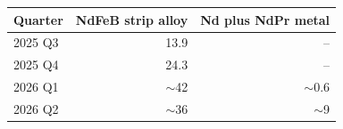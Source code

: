 \begin{tabular}{lrr}
\toprule Quarter & NdFeB strip alloy & Nd plus NdPr metal \\
\midrule
2025 Q3 & 13.9 & -- \\
2025 Q4 & 24.3 & -- \\
2026 Q1 & $\sim$42 & $\sim$0.6 \\
2026 Q2 & $\sim$36 & $\sim$9 \\
\bottomrule
\end{tabular}
